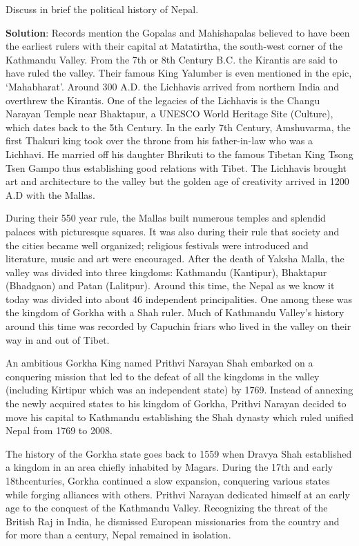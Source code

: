 \documentclass[
  openany]{book}
\newcommand{\question}{\item}
\newenvironment{solution}{ {\bfseries Solution}:}{}
\begin{document}
\begin{questions}

\question Discuss in brief the political history of Nepal.

\begin{solution}
Records mention the Gopalas and Mahishapalas believed to have been the earliest rulers with their capital at Matatirtha, the south-west corner of the Kathmandu Valley. From the 7th or 8th Century B.C. the Kirantis are said to have ruled the valley. Their famous King Yalumber is even mentioned in the epic, ‘Mahabharat’. Around 300 A.D. the Lichhavis arrived from northern India and overthrew the Kirantis. One of the legacies of the Lichhavis is the Changu Narayan Temple near Bhaktapur, a UNESCO World Heritage Site (Culture), which dates back to the 5th Century. In the early 7th Century, Amshuvarma, the first Thakuri king took over the throne from his father-in-law who was a Lichhavi. He married off his daughter Bhrikuti to the famous Tibetan King Tsong Tsen Gampo thus establishing good relations with Tibet. The Lichhavis brought art and architecture to the valley but the golden age of creativity arrived in 1200 A.D with the Mallas.

During their 550 year rule, the Mallas built numerous temples and splendid palaces with picturesque squares. It was also during their rule that society and the cities became well organized; religious festivals were introduced and literature, music and art were encouraged. After the death of Yaksha Malla, the valley was divided into three kingdoms: Kathmandu (Kantipur), Bhaktapur (Bhadgaon) and Patan (Lalitpur). Around this time, the Nepal as we know it today was divided into about 46 independent principalities. One among these was the kingdom of Gorkha with a Shah ruler. Much of Kathmandu Valley’s history around this time was recorded by Capuchin friars who lived in the valley on their way in and out of Tibet.

An ambitious Gorkha King named Prithvi Narayan Shah embarked on a conquering mission that led to the defeat of all the kingdoms in the valley (including Kirtipur which was an independent state) by 1769. Instead of annexing the newly acquired states to his kingdom of Gorkha, Prithvi Narayan decided to move his capital to Kathmandu establishing the Shah dynasty which ruled unified Nepal from 1769 to 2008.

The history of the Gorkha state goes back to 1559 when Dravya Shah established a kingdom in an area chiefly inhabited by Magars. During the 17th and early 18thcenturies, Gorkha continued a slow expansion, conquering various states while forging alliances with others. Prithvi Narayan dedicated himself at an early age to the conquest of the Kathmandu Valley. Recognizing the threat of the British Raj in India, he dismissed European missionaries from the country and for more than a century, Nepal remained in isolation.


\end{solution}
\end{questions}
\end{document}
